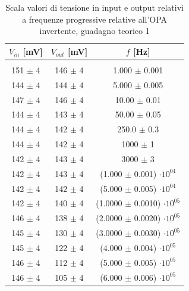 \documentclass[journal]{IEEEtran}
\begin{document}
\begin{table}[H]
\centering

\begin{tabular}{c|c|c}
\multicolumn{1}{c|}{$V_{in}$ {[}mV{]}} & \multicolumn{1}{|c|}{$V_{out}$ {[}mV{]}} & \multicolumn{1}{c}{$f$ {[}Hz{]}}\\ 
\hline  \\
151 $\pm$ 4 & 146 $\pm$ 4 & 1.000 $\pm$ 0.001  \\
144 $\pm$ 4 & 144 $\pm$ 4 & 5.000 $\pm$ 0.005  \\
147 $\pm$ 4 & 146 $\pm$ 4 & 10.00 $\pm$ 0.01   \\
144 $\pm$ 4 & 143 $\pm$ 4 & 50.00 $\pm$ 0.05   \\
144 $\pm$ 4 & 142 $\pm$ 4 & 250.0 $\pm$ 0.3    \\
144 $\pm$ 4 & 142 $\pm$ 4 & 1000 $\pm$ 1       \\
142 $\pm$ 4 & 143 $\pm$ 4 & 3000 $\pm$ 3       \\
142 $\pm$ 4 & 143 $\pm$ 4 & (1.000 $\pm$ 0.001) $\cdot 10^{04}$            \\
142 $\pm$ 4 & 142 $\pm$ 4 & (5.000 $\pm$ 0.005) $\cdot 10^{04}$   \\
142 $\pm$ 4 & 140 $\pm$ 4 & (1.0000 $\pm$ 0.0010) $\cdot 10^{05}$ \\
146 $\pm$ 4 & 138 $\pm$ 4 & (2.0000 $\pm$ 0.0020) $\cdot 10^{05}$ \\
145 $\pm$ 4 & 130 $\pm$ 4 & (3.0000 $\pm$ 0.0030) $\cdot 10^{05}$ \\
145 $\pm$ 4 & 122 $\pm$ 4 & (4.000 $\pm$ 0.004) $\cdot 10^{05}$   \\
146 $\pm$ 4 & 112 $\pm$ 4 & (5.000 $\pm$ 0.005) $\cdot 10^{05}$   \\
146 $\pm$ 4 & 105 $\pm$ 4 & (6.000 $\pm$ 0.006) $\cdot 10^{05}$   \\
\end{tabular}
\vspace{5 mm}
\caption{Scala valori di tensione in input e output relativi a frequenze progressive relative all'OPA invertente, guadagno teorico 1}
\label{tab:opa-inv-g1}
\end{table}
\end{document}
